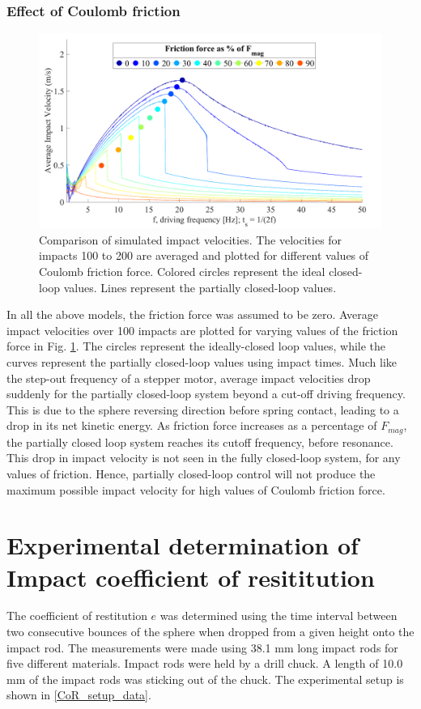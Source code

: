 \documentclass[letterpaper, 10 pt, conference]{ieeeconf}  %
\begin{document}
\subsubsection{Effect of Coulomb friction}
\label{frictionwriteup}
\begin{figure}
	\includegraphics[width=\linewidth]{FrictionForceWithClosedLoopValues.pdf}
		\caption[Effect of Coulomb friction on partially closed-loop control]{Comparison of  simulated impact velocities. The  velocities for impacts 100 to 200 are averaged and plotted for different values of Coulomb friction force. Colored circles represent the ideal closed-loop values.  Lines represent the partially closed-loop values.}
	\label{friction}
	
\end{figure}
In all the above models, the friction force was assumed to be zero. Average impact velocities over 100 impacts are plotted for varying values of the friction force in Fig. \ref{friction}. The circles represent the ideally-closed loop values, while the curves represent the partially closed-loop values using impact times. Much like the step-out frequency of a stepper motor, average impact velocities drop suddenly for the partially closed-loop system beyond a cut-off driving frequency. This is due to the sphere reversing direction before spring contact, leading to a drop in its net kinetic energy. As friction force increases as a percentage of $F_{mag}$, the partially closed loop system reaches its cutoff frequency, before resonance. This drop in impact velocity is not seen in the fully closed-loop system, for any values of friction. Hence, partially closed-loop control will not produce the maximum possible impact velocity for high values of Coulomb friction force. 


\section{Experimental determination of Impact coefficient of resititution}
\label{cor_det}
The coefficient of restitution $e$ was determined using the time interval between two consecutive bounces of the sphere when dropped from a given height onto the impact rod. The measurements were made using 38.1 mm long impact rods for five different materials. Impact rods were held by a drill chuck. A length of 10.0 mm of the impact rods was sticking out of the chuck. The experimental setup is shown in \cref{CoR_setup_data}.
\end{document}
